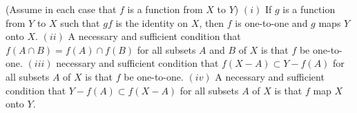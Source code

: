 \begin{named}[Exercise. ] (Assume in each case that $f$ is a function from $X$ to $Y$) $(i)$ If $g$ is a function from $Y$ to $X$ such that $gf$ is the identity on $X$, then $f$ is one-to-one and $g$ maps $Y$ onto $X$. $(ii)$ A necessary and sufficient condition that $f(A \cap B) = f(A) \cap f(B)$ for all subsets $A$ and $B$ of $X$ is that $f$ be one-to-one. $(iii)$ necessary and sufficient condition that $f(X - A) \subset Y - f(A)$ for all subsets $A$ of $X$ is that $f$ be one-to-one. $(iv)$ A necessary and sufficient condition that $Y - f(A) \subset f(X - A)$ for all subsets $A$ of $X$ is that $f$ map $X$ onto $Y$.
\end{named}
